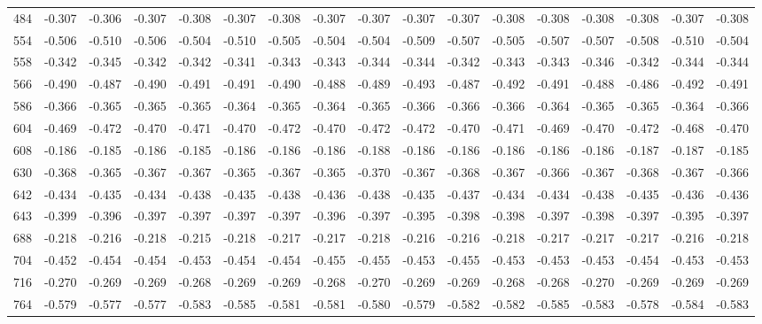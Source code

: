 \documentclass{amsart}
\begin{document}
\begin{landscape}
\begin{longtable}{rrrrrrrrrrrrrrrrr}
  484 & -0.307 & -0.306 & -0.307 & -0.308 & -0.307 & -0.308 & -0.307 & -0.307 & -0.307 & -0.307 & -0.308 & -0.308 & -0.308 & -0.308 & -0.307 & -0.308 \\ 
  554 & -0.506 & -0.510 & -0.506 & -0.504 & -0.510 & -0.505 & -0.504 & -0.504 & -0.509 & -0.507 & -0.505 & -0.507 & -0.507 & -0.508 & -0.510 & -0.504 \\ 
  558 & -0.342 & -0.345 & -0.342 & -0.342 & -0.341 & -0.343 & -0.343 & -0.344 & -0.344 & -0.342 & -0.343 & -0.343 & -0.346 & -0.342 & -0.344 & -0.344 \\ 
  566 & -0.490 & -0.487 & -0.490 & -0.491 & -0.491 & -0.490 & -0.488 & -0.489 & -0.493 & -0.487 & -0.492 & -0.491 & -0.488 & -0.486 & -0.492 & -0.491 \\ 
  586 & -0.366 & -0.365 & -0.365 & -0.365 & -0.364 & -0.365 & -0.364 & -0.365 & -0.366 & -0.366 & -0.366 & -0.364 & -0.365 & -0.365 & -0.364 & -0.366 \\ 
  604 & -0.469 & -0.472 & -0.470 & -0.471 & -0.470 & -0.472 & -0.470 & -0.472 & -0.472 & -0.470 & -0.471 & -0.469 & -0.470 & -0.472 & -0.468 & -0.470 \\ 
  608 & -0.186 & -0.185 & -0.186 & -0.185 & -0.186 & -0.186 & -0.186 & -0.188 & -0.186 & -0.186 & -0.186 & -0.186 & -0.186 & -0.187 & -0.187 & -0.185 \\ 
  630 & -0.368 & -0.365 & -0.367 & -0.367 & -0.365 & -0.367 & -0.365 & -0.370 & -0.367 & -0.368 & -0.367 & -0.366 & -0.367 & -0.368 & -0.367 & -0.366 \\ 
  642 & -0.434 & -0.435 & -0.434 & -0.438 & -0.435 & -0.438 & -0.436 & -0.438 & -0.435 & -0.437 & -0.434 & -0.434 & -0.438 & -0.435 & -0.436 & -0.436 \\ 
  643 & -0.399 & -0.396 & -0.397 & -0.397 & -0.397 & -0.397 & -0.396 & -0.397 & -0.395 & -0.398 & -0.398 & -0.397 & -0.398 & -0.397 & -0.395 & -0.397 \\ 
  688 & -0.218 & -0.216 & -0.218 & -0.215 & -0.218 & -0.217 & -0.217 & -0.218 & -0.216 & -0.216 & -0.218 & -0.217 & -0.217 & -0.217 & -0.216 & -0.218 \\ 
  704 & -0.452 & -0.454 & -0.454 & -0.453 & -0.454 & -0.454 & -0.455 & -0.455 & -0.453 & -0.455 & -0.453 & -0.453 & -0.453 & -0.454 & -0.453 & -0.453 \\ 
  716 & -0.270 & -0.269 & -0.269 & -0.268 & -0.269 & -0.269 & -0.268 & -0.270 & -0.269 & -0.269 & -0.268 & -0.268 & -0.270 & -0.269 & -0.269 & -0.269 \\ 
  764 & -0.579 & -0.577 & -0.577 & -0.583 & -0.585 & -0.581 & -0.581 & -0.580 & -0.579 & -0.582 & -0.582 & -0.585 & -0.583 & -0.578 & -0.584 & -0.583 \\ 

\end{longtable}
\end{landscape}
\end{document}

